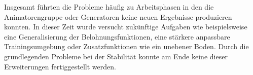 Insgesamt führten die Probleme häufig zu Arbeitsphasen in den die Animatorengruppe oder Generatoren keine neuen Ergebnisse produzieren konnten. In dieser Zeit wurde versucht zukünftige Aufgaben wie beispielsweise eine Generalisierung der Belohnungsfunktionen, eine stärkere anpassbare Trainingsumgebung oder Zusatzfunktionen wie ein unebener Boden. Durch die grundlegenden Probleme bei der Stabilität konnte am Ende keine dieser Erweiterungen fertiggestellt werden.